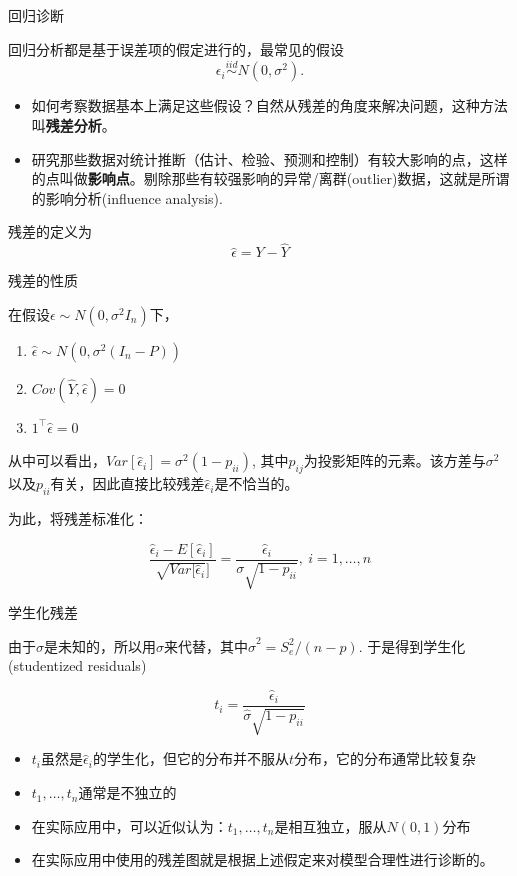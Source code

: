 \documentclass[ignorenonframetext,]{beamer}
\begin{document}
\begin{frame}{回归诊断}

回归分析都是基于误差项的假定进行的，最常见的假设\[\epsilon_i\stackrel{iid}{\sim}N(0,\sigma^2).\]

\begin{itemize}
\item
  如何考察数据基本上满足这些假设？自然从残差的角度来解决问题，这种方法叫\textbf{残差分析}。
\item
  研究那些数据对统计推断（估计、检验、预测和控制）有较大影响的点，这样的点叫做\textbf{影响点}。剔除那些有较强影响的异常/离群(outlier)数据，这就是所谓的影响分析(influence
  analysis).
\end{itemize}

残差的定义为 \[\hat\epsilon = Y-\hat Y\]

\end{frame}

\begin{frame}{残差的性质}

在假设\(\epsilon\sim N(0,\sigma^2I_n)\)下，

\begin{enumerate}
\item
  \(\hat\epsilon \sim N(0,\sigma^2(I_n-P))\)
\item
  \(Cov(\hat Y,\hat\epsilon) = 0\)
\item
  \(1^\top\hat\epsilon = 0\)
\end{enumerate}

从中可以看出，\(Var[\hat\epsilon_i] = \sigma^2(1-p_{ii})\),
其中\(p_{ij}\)为投影矩阵的元素。该方差与\(\sigma^2\)以及\(p_{ii}\)有关，因此直接比较残差\(\hat\epsilon_i\)是不恰当的。

为此，将残差标准化：

\[\frac{\hat\epsilon_i-E[\hat\epsilon_i]}{\sqrt{Var[\hat\epsilon_i}]}= \frac{\hat\epsilon_i}{\sigma\sqrt{1-p_{ii}}},\ i=1,\dots,n\]

\end{frame}

\begin{frame}{学生化残差}

由于\(\sigma\)是未知的，所以用\(\hat\sigma\)来代替，其中\(\hat\sigma^2 = S_e^2/(n-p)\).
于是得到学生化(studentized residuals)

\[t_i = \frac{\hat\epsilon_i}{\hat{\sigma}\sqrt{1-p_{ii}}}\]

\begin{itemize}
\item
  \(t_i\)虽然是\(\hat\epsilon_i\)的学生化，但它的分布并不服从\(t\)分布，它的分布通常比较复杂
\item
  \(t_1,\dots,t_n\)通常是不独立的
\item
  在实际应用中，可以近似认为：\(t_1,\dots,t_n\)是相互独立，服从\(N(0,1)\)分布
\item
  在实际应用中使用的残差图就是根据上述假定来对模型合理性进行诊断的。
\end{itemize}

\end{frame}
\end{document}
